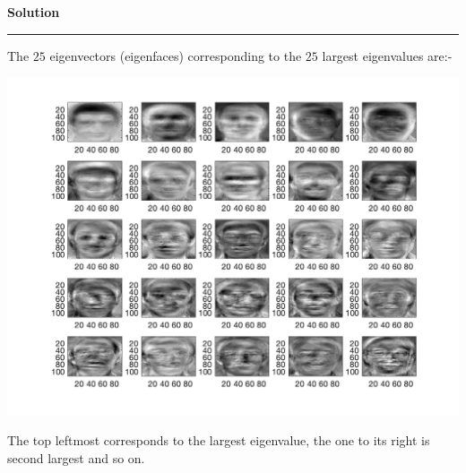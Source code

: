 \documentclass[a4paper,14pt]{article}
\newenvironment{solution}[2][]{%
    \begin{mdframed}[linecolor=blue!70!black, linewidth=2pt, roundcorner=10pt, backgroundcolor=yellow!10!white, skipabove=12pt, skipbelow=12pt]%
        \textbf{\large #2}
        \par\noindent\rule{\textwidth}{0.4pt}
}{
    \end{mdframed}
}
\begin{document}
\begin{solution}{Solution}
\begin{itemize}
		The $25$ eigenvectors (eigenfaces) corresponding to the $25$ largest eigenvalues are:-

		\begin{center}
			\includegraphics[width=0.88\linewidth]{../images/ORL_eigenfaces.png}
		\end{center}

		The top leftmost corresponds to the largest eigenvalue, the one to its right is second largest and so on.
	\end{itemize}
\end{solution}
\end{document}
